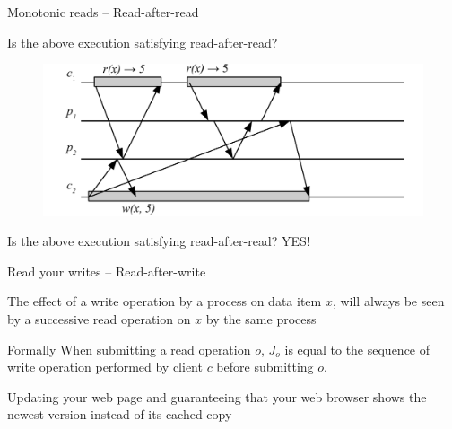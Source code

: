 \begin{frame}{Monotonic reads -- Read-after-read}
\begin{overprint}
\BI
\item Is the above execution satisfying read-after-read?
\EI
{}
\begin{figure}
	\includegraphics[width=\textwidth]{read-after-read-02n}
\end{figure}
\BI
\item Is the above execution satisfying read-after-read? \quad YES!
\EI

\end{overprint}
\end{frame}


\begin{frame}{Read your writes -- Read-after-write}

\begin{definition}
The effect of a write operation by a process on data item $x$, will always 
be seen by a successive read operation on $x$ by the same process
\vspace{-12pt}
\begin{center}
\begin{minipage}{0.95\textwidth}
\begin{block}{Formally}
When submitting a read operation $o$,
$J_o$ is equal to  the sequence of write operation performed by client $c$ before
submitting $o$.
\end{block}
\end{minipage}
\end{center}
\end{definition}

\begin{example}
Updating your web page and guaranteeing that your web browser shows the
newest version instead of its cached copy
\end{example}

\end{frame}

